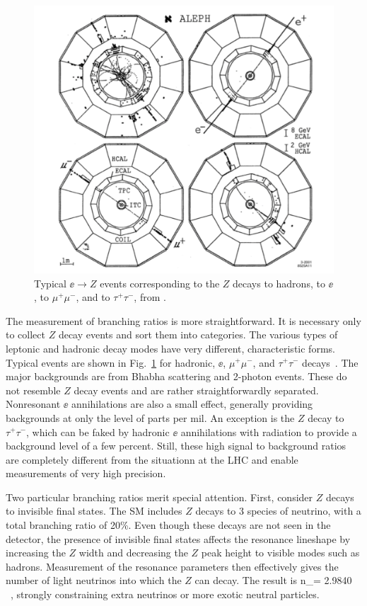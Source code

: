 \documentclass[12pt]{article}
\begin{document}
\begin{figure}
\begin{center}
\includegraphics[width=0.60\hsize]{ALEPHtypes.pdf}
\end{center}
\caption{Typical $\ee\to Z$ events corresponding to the $Z$ decays to
  hadrons, to $\ee$, to $\mu^+\mu^-$, and to $\tau^+\tau^-$, from 
\cite{ALEPHtypes}. }
\label{fig:ALEPHtypes}
\end{figure}


The measurement of branching ratios is more straightforward.  It is
necessary only to collect $Z$ decay events and sort them into
categories.   The various types of leptonic and hadronic decay modes
have very different, characteristic forms.  Typical events are shown in 
Fig.~\ref{fig:ALEPHtypes} for hadronic, $\ee$, $\mu^+\mu^-$, and
$\tau^+\tau^-$ decays~\cite{ALEPHtypes}.   The major backgrounds are
from Bhabha scattering and 2-photon events.  These do not resemble $Z$
decay events and are rather straightforwardly separated.   Nonresonant $\ee$
annihilations are also a small effect, generally providing backgrounds at only
the level of parts per mil. An exception is the $Z$ decay to
$\tau^+\tau^-$, which can be faked by hadronic
$\ee$ annihilations with radiation to provide a
background level of a few percent.   Still, these high signal to
background ratios are completely different from the situationn at the
LHC and enable measurements of very high precision.

Two particular branching ratios merit special attention.   First,
consider $Z$ decays to invisible final states.   The SM includes $Z$
decays to 3 species of neutrino, with a total branching ratio of
20\%.   Even though these decays are not seen in the detector, 
 the presence of invisible final states affects the resonance
lineshape  by increasing the $Z$ width and decreasing the $Z$ peak
height to visible modes such as hadrons.  Measurement of the resonance
parameters then effectively gives the number of light neutrinos into
which the $Z$ can decay.   The result is
\beq
    n_\nu = 2.9840  \ ,
\eeqn
strongly constraining extra neutrinos or more exotic neutral
particles.
\end{document}
